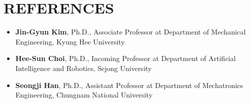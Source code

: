 \documentclass[a4paper,10pt]{extarticle}
\begin{document}
\section*{REFERENCES}
\begin{itemize}
	\item \textbf{Jin-Gyun Kim}, Ph.D., {\small Associate Professor at Department of Mechanical Engineering, Kyung Hee University}  %
	\item \textbf{Hee-Sun Choi}, Ph.D., {\small Incoming Professor at Department of Artificial Intelligence and Robotics, Sejong University}%
	\item \textbf{Seongji Han}, Ph.D., {\small Assistant Professor at Department of Mechatronics Engineering, Chungnam National University} %
\end{itemize}
\end{document}
